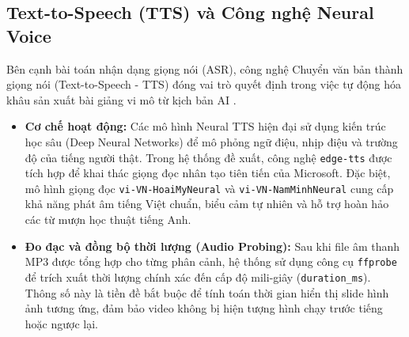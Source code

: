 \subsection{Text-to-Speech (TTS) và Công nghệ Neural Voice}
\label{subsec:edge-tts-theory}
Bên cạnh bài toán nhận dạng giọng nói (ASR), công nghệ Chuyển văn bản thành giọng nói (Text-to-Speech - TTS) đóng vai trò quyết định trong việc tự động hóa khâu sản xuất bài giảng vi mô từ kịch bản AI \cite{microsoft_edgetts}.
\begin{itemize}
    \item \textbf{Cơ chế hoạt động:} Các mô hình Neural TTS hiện đại sử dụng kiến trúc học sâu (Deep Neural Networks) để mô phỏng ngữ điệu, nhịp điệu và trường độ của tiếng người thật. Trong hệ thống đề xuất, công nghệ \texttt{edge-tts} được tích hợp để khai thác giọng đọc nhân tạo tiên tiến của Microsoft. Đặc biệt, mô hình giọng đọc \texttt{vi-VN-HoaiMyNeural} và \texttt{vi-VN-NamMinhNeural} cung cấp khả năng phát âm tiếng Việt chuẩn, biểu cảm tự nhiên và hỗ trợ hoàn hảo các từ mượn học thuật tiếng Anh.
    \item \textbf{Đo đạc và đồng bộ thời lượng (Audio Probing):} Sau khi file âm thanh MP3 được tổng hợp cho từng phân cảnh, hệ thống sử dụng công cụ \texttt{ffprobe} để trích xuất thời lượng chính xác đến cấp độ mili-giây (\texttt{duration\_ms}). Thông số này là tiền đề bắt buộc để tính toán thời gian hiển thị slide hình ảnh tương ứng, đảm bảo video không bị hiện tượng hình chạy trước tiếng hoặc ngược lại.
\end{itemize}

